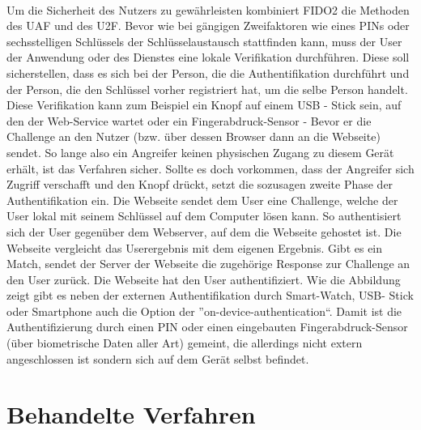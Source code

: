 \\
Um die Sicherheit des Nutzers zu gewährleisten kombiniert FIDO2 die Methoden des UAF und des U2F. Bevor wie bei gängigen Zweifaktoren wie eines PINs oder sechsstelligen Schlüssels der Schlüsselaustausch stattfinden kann, muss der User der Anwendung oder des Dienstes eine lokale Verifikation durchführen. Diese soll sicherstellen, dass es sich bei der Person, die die Authentifikation durchführt und der Person, die den Schlüssel vorher registriert hat, um die selbe Person handelt. Diese Verifikation kann zum Beispiel ein Knopf auf einem USB - Stick sein, auf den der Web-Service wartet oder ein Fingerabdruck-Sensor - Bevor er die Challenge an den Nutzer (bzw. über dessen Browser dann an die Webseite) sendet. So lange also ein Angreifer keinen physischen Zugang zu diesem Gerät erhält, ist das Verfahren sicher. Sollte es doch vorkommen, dass der Angreifer sich Zugriff verschafft und den Knopf drückt, setzt die sozusagen zweite Phase der Authentifikation ein. Die Webseite sendet dem User eine Challenge, welche der User lokal mit seinem Schlüssel auf dem Computer lösen kann. So authentisiert sich der User gegenüber dem Webserver, auf dem die Webseite gehostet ist. Die Webseite vergleicht das Userergebnis mit dem eigenen Ergebnis. Gibt es ein Match, sendet der Server der Webseite die zugehörige Response zur Challenge an den User zurück. Die Webseite hat den User authentifiziert. Wie die Abbildung zeigt gibt es neben der externen Authentifikation durch Smart-Watch, USB- Stick oder Smartphone auch die Option der ''on-device-authentication``. Damit ist die Authentifizierung durch einen PIN oder einen eingebauten Fingerabdruck-Sensor (über biometrische Daten aller Art) gemeint, die allerdings nicht extern angeschlossen ist sondern sich auf dem Gerät selbst befindet.

\section{Behandelte Verfahren}
